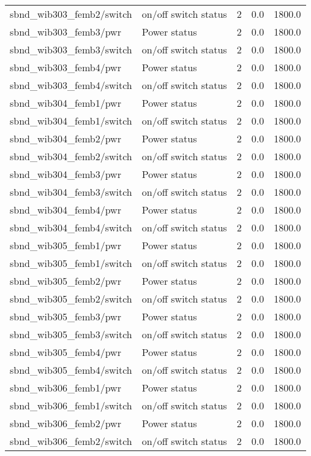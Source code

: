 \begin{center}
\begin{longtable}{l | l l l l }
sbnd\_wib303\_femb2/switch & on/off switch status & 2 & 0.0 & 1800.0\\ 
sbnd\_wib303\_femb3/pwr & Power status & 2 & 0.0 & 1800.0\\ 
sbnd\_wib303\_femb3/switch & on/off switch status & 2 & 0.0 & 1800.0\\ 
sbnd\_wib303\_femb4/pwr & Power status & 2 & 0.0 & 1800.0\\ 
sbnd\_wib303\_femb4/switch & on/off switch status & 2 & 0.0 & 1800.0\\ 
sbnd\_wib304\_femb1/pwr & Power status & 2 & 0.0 & 1800.0\\ 
sbnd\_wib304\_femb1/switch & on/off switch status & 2 & 0.0 & 1800.0\\ 
sbnd\_wib304\_femb2/pwr & Power status & 2 & 0.0 & 1800.0\\ 
sbnd\_wib304\_femb2/switch & on/off switch status & 2 & 0.0 & 1800.0\\ 
sbnd\_wib304\_femb3/pwr & Power status & 2 & 0.0 & 1800.0\\ 
sbnd\_wib304\_femb3/switch & on/off switch status & 2 & 0.0 & 1800.0\\ 
sbnd\_wib304\_femb4/pwr & Power status & 2 & 0.0 & 1800.0\\ 
sbnd\_wib304\_femb4/switch & on/off switch status & 2 & 0.0 & 1800.0\\ 
sbnd\_wib305\_femb1/pwr & Power status & 2 & 0.0 & 1800.0\\ 
sbnd\_wib305\_femb1/switch & on/off switch status & 2 & 0.0 & 1800.0\\ 
sbnd\_wib305\_femb2/pwr & Power status & 2 & 0.0 & 1800.0\\ 
sbnd\_wib305\_femb2/switch & on/off switch status & 2 & 0.0 & 1800.0\\ 
sbnd\_wib305\_femb3/pwr & Power status & 2 & 0.0 & 1800.0\\ 
sbnd\_wib305\_femb3/switch & on/off switch status & 2 & 0.0 & 1800.0\\ 
sbnd\_wib305\_femb4/pwr & Power status & 2 & 0.0 & 1800.0\\ 
sbnd\_wib305\_femb4/switch & on/off switch status & 2 & 0.0 & 1800.0\\ 
sbnd\_wib306\_femb1/pwr & Power status & 2 & 0.0 & 1800.0\\ 
sbnd\_wib306\_femb1/switch & on/off switch status & 2 & 0.0 & 1800.0\\ 
sbnd\_wib306\_femb2/pwr & Power status & 2 & 0.0 & 1800.0\\ 
sbnd\_wib306\_femb2/switch & on/off switch status & 2 & 0.0 & 1800.0\\ 

\end{longtable}
\end{center}
